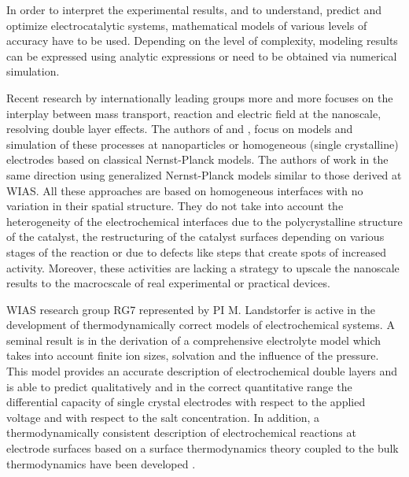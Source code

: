 \documentclass[a4paper,10pt]{article}
\begin{document}
In order  to interpret  the experimental  results, and  to understand,
predict and optimize electrocatalytic  systems, mathematical models of
various  levels of  accuracy have to be used. Depending  on the  level of  complexity,
modeling  results  can  be  expressed using  analytic  expressions  or
need to be obtained via numerical simulation.


Recent research by  internationally leading groups  more and
more focuses  on the  interplay between  mass transport,  reaction and
electric    field    at    the     nanoscale, resolving double layer effects.
The    authors    of
\cite{lin2019understanding}          and         \cite{tan2018double},
\cite{eden2019modeling} focus on models and simulation of these processes
at nanoparticles or homogeneous  (single crystalline) electrodes based
on     classical    Nernst-Planck     models.    The     authors    of
\cite{bohra2019modeling} work in the  same direction using generalized
Nernst-Planck models similar to those derived at WIAS.
All these approaches are based on homogeneous interfaces with no variation in their
spatial  structure. They  do   not  take  into  account  the
heterogeneity   of   the   electrochemical  interfaces   due   to   the
polycrystalline structure  of the  catalyst, the restructuring  of the
catalyst surfaces depending  on various stages of the  reaction or due
to defects like steps that create spots of increased activity.
Moreover, these activities are lacking a strategy to upscale the nanoscale
results to the macrocscale of real experimental or practical devices.



WIAS research group  RG7 represented by PI M. Landstorfer is active
in the development of thermodynamically correct models of electrochemical systems.
A seminal result is in the derivation of a comprehensive electrolyte model which takes into account finite
ion sizes, solvation and the influence of the pressure.
This model provides an accurate description of electrochemical double
layers  and is  able to  predict qualitatively and in the correct quantitative range the
differential capacity of single crystal electrodes with respect to the applied voltage and
with respect to the salt concentration. In addition,  a thermodynamically consistent
description of electrochemical reactions at electrode surfaces based on a surface thermodynamics
theory coupled to the bulk thermodynamics have been developed
\cite{DGM2013,DGL2014,Landstorfer2016187,landstorfer2017boundary}.
\end{document}
